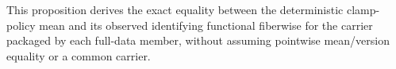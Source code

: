 This proposition derives the exact equality between the deterministic clamp-policy mean and its observed identifying functional fiberwise for the carrier packaged by each full-data member, without assuming pointwise mean/version equality or a common carrier.